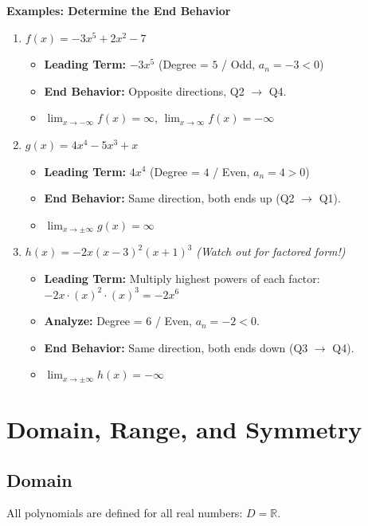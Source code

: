 \documentclass[12pt]{article}
\begin{document}
\vspace{1em}
\noindent\textbf{Examples: Determine the End Behavior}
\begin{enumerate}
    \item $f(x) = -3x^5 + 2x^2 - 7$
    \begin{itemize}
        \item \textbf{Leading Term:} $-3x^5$ (Degree = $5$ / Odd, $a_n = -3 < 0$)
        \item \textbf{End Behavior:} Opposite directions, Q2 $\to$ Q4.
        \item $\lim_{x \to -\infty} f(x) = \infty$, \quad $\lim_{x \to \infty} f(x) = -\infty$
    \end{itemize}
    
    \item $g(x) = 4x^4 - 5x^3 + x$
    \begin{itemize}
        \item \textbf{Leading Term:} $4x^4$ (Degree = $4$ / Even, $a_n = 4 > 0$)
        \item \textbf{End Behavior:} Same direction, both ends up (Q2 $\to$ Q1).
        \item $\lim_{x \to \pm\infty} g(x) = \infty$
    \end{itemize}

    \item $h(x) = -2x(x-3)^2(x+1)^3$ \quad \textit{(Watch out for factored form!)}
    \begin{itemize}
        \item \textbf{Leading Term:} Multiply highest powers of each factor: $-2x \cdot (x)^2 \cdot (x)^3 = -2x^6$
        \item \textbf{Analyze:} Degree = $6$ / Even, $a_n = -2 < 0$.
        \item \textbf{End Behavior:} Same direction, both ends down (Q3 $\to$ Q4).
        \item $\lim_{x \to \pm\infty} h(x) = -\infty$
    \end{itemize}
\end{enumerate}

\section{Domain, Range, and Symmetry}
\subsection{Domain}
All polynomials are defined for all real numbers: $D = \mathbb{R}$.
\end{document}
